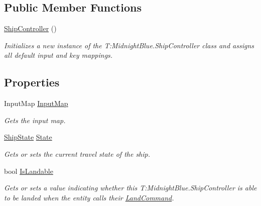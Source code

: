 \subsection*{Public Member Functions}
\begin{DoxyCompactItemize}
\item 
\hyperlink{class_midnight_blue_1_1_ship_controller_a07d38d2b98b9b132f1eff9cc8879f278}{Ship\+Controller} ()
\begin{DoxyCompactList}\small\item\em Initializes a new instance of the T\+:\+Midnight\+Blue.\+Ship\+Controller class and assigns all default input and key mappings. \end{DoxyCompactList}\end{DoxyCompactItemize}
\subsection*{Properties}
\begin{DoxyCompactItemize}
\item 
Input\+Map \hyperlink{class_midnight_blue_1_1_ship_controller_a50136c59b5a0e80d280aec4b6de46414}{Input\+Map}
\begin{DoxyCompactList}\small\item\em Gets the input map. \end{DoxyCompactList}\item 
\hyperlink{namespace_midnight_blue_a46fd3250d826e0dec67892328d5b368c}{Ship\+State} \hyperlink{class_midnight_blue_1_1_ship_controller_a032da447be3b66b7998349ae825d4edb}{State}
\begin{DoxyCompactList}\small\item\em Gets or sets the current travel state of the ship. \end{DoxyCompactList}\item 
bool \hyperlink{class_midnight_blue_1_1_ship_controller_ad07cfa737db5a712aedcc2528b953683}{Is\+Landable}
\begin{DoxyCompactList}\small\item\em Gets or sets a value indicating whether this T\+:\+Midnight\+Blue.\+Ship\+Controller is able to be landed when the entity calls their \hyperlink{class_midnight_blue_1_1_land_command}{Land\+Command}. \end{DoxyCompactList}\end{DoxyCompactItemize}


